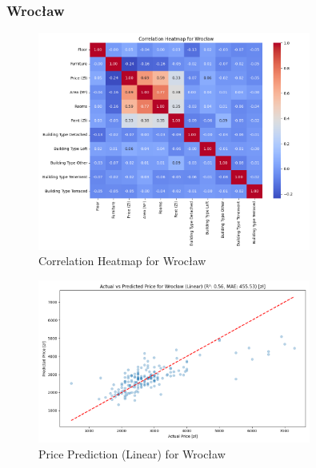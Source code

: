\subsubsection{Wrocław}
\begin{figure}[H]
    \centering
    \includegraphics[width=0.8\textwidth]{figures/wroclaw_correlation_heatmap.png}
    \caption{Correlation Heatmap for Wrocław}
\end{figure}
\begin{figure}[H]
    \centering
    \includegraphics[width=0.8\textwidth]{figures/wroclaw_price_prediction_linear.png}
    \caption{Price Prediction (Linear) for Wrocław}
\end{figure}

